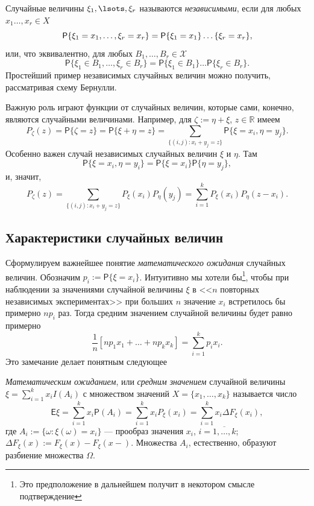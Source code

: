 Случайные величины $ \xi_1, \lsots, \xi_r $ называются \emph{независимыми}, если
для любых $ x_1\ldots,x_r\in X$ 
\[
	\mathsf P \{\xi_1 = x_1, \ldots, \xi_r = x_r\} = \mathsf
	P\{\xi_1=x_1\}\ldots\mathsf\{\xi_r=x_r\},
\]
или, что эквивалентно, для любых $ B_1,\ldots,B_r \in \mathscr X $ 
\[
	\mathsf P\{\xi_1\in B_1, \ldots, \xi_r\in B_r\} = \mathsf P\{\xi_1 \in
	B_1\}\ldots\mathsf P\{\xi_r\in B_r\}.
\]
Простейший пример независимых случайных величин можно получить, 
рассматривая схему Бернулли.

Важную роль играют функции от случайных величин, которые сами, конечно, являются
случайными величинами. Например, для $ \zeta := \eta
+ \xi$, $ z\in \mathbb R $ имеем  
\[
	P_\zeta(z) = \mathsf P\{\zeta = z\} = \mathsf P\{\xi +\eta = z\} =
	\sum_{\{(i,j)\colon x_i + y_j = z\}} \mathsf P\{\xi = x_i, \eta= y_j\}.
\]
Особенно важен случай независимых случайных величин $ \xi $ и $ \eta $. Там
\[
	\mathsf P\{\xi = x_i, \eta = y_i\} = \mathsf P\{\xi = x_i\} \mathsf
	P\{\eta=y_j\},
\]
и, значит,  
\[
	P_\zeta(z) = \sum_{\{(i,j)\colon x_i + y_j = z\}} P_\xi(x_i)P_\eta(y_j) =
	\sum_{i=1}^k P_\xi(x_i) P_\eta(z-x_i).
\]


\subsection{Характеристики случайных величин}
Сформулируем важнейшее понятие \emph{математического ожидания} случайных
величин. Обозначим $ p_i := \mathsf P\{\xi = x_i\} $. Интуитивно мы хотели
бы\footnote{Это предположение в дальнейшем получит в некотором смысле
подтверждение},
чтобы при наблюдении за значениями случайной величины $ \xi $ в <<$ n $
повторных независимых экспериментах>> при больших $ n $ значение $ x_i $
встретилось бы
примерно $ np_i $ раз. Тогда средним значением случайной величины будет равно
примерно 
\[
	\frac{1}{n} [np_1x_1 + \ldots + np_kx_k] = \sum_{i=1}^k p_ix_i.
\]
Это замечание делает понятным следующее 
\begin{definition}
\emph{Математическим ожиданием}, или \emph{средним значением} случайной величины
$ \xi = \sum_{i=1}^k x_i I(A_i) $ с множеством значений $ X = \{x_1, \ldots,
x_k\} $ называется число 
\[
	\mathsf E \xi = \sum_{i=1}^k x_i \mathsf P(A_i) = \sum_{i=1}^k x_i
	P_\xi(x_i) = \sum_{i=1}^k x_i \Delta F_\xi(x_i),
\]
где $ A_i := \{ \omega\colon \xi(\omega) = x_i\} $ --- прообраз значения $ x_i $, $ i =
\overline{1, \ldots, k} $; $ \Delta F_\xi(x) := F_\xi(x)-F_\xi(x-) $. Множества $ A_i $, естественно, образуют разбиение
множества $ \Omega $.
\end{definition}

